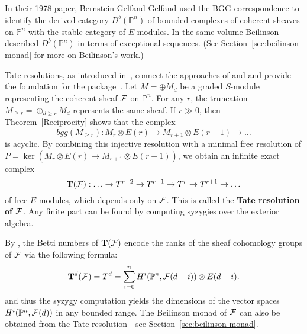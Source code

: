 \documentclass[twoside,12pt, leqno]{amsart}
\def\PP{{\mathbb P}}
\def\bT{{\bf T}}
\def\CU{{\mathcal U}}
\def\daniel#1{{\bf *** Daniel:} #1 {\bf ***}}
\begin{document}
In their 1978 paper, Bernstein-Gelfand-Gelfand \cite{BGG} used the BGG correspondence to identify  the derived category $D^b(\PP^n)$ of bounded complexes of coherent sheaves on $\PP^n$ with the stable category of $E$-modules. In the same volume \cite{beilinson} Beilinson described
$D^b(\PP^n)$ in terms of exceptional sequences.  (See Section~\ref{sec:beilinson monad} for more on Beilinson's work.)


Tate resolutions, as introduced in~\cite{EFS}, connect the approaches of \cite{BGG} and \cite{beilinson} and provide the foundation for the package~\cite{M2BGG}.
Let $M=\oplus M_d$ be a graded $S$-module representing the coherent sheaf ${\mathcal F}$ on $\PP^n$. For any $r$, the truncation $M_{\ge r} = \oplus_{d \ge r}M_d$ represents the same sheaf.  If $r\gg 0$, then Theorem~\ref{Reciprocity} shows that the  complex
$$
bgg(M_{\ge r}) : M_r\otimes E(r) \to M_{r+1}\otimes E(r+1) \to \ldots
$$ 
is acyclic. By combining this injective resolution with a minimal free resolution of $P=\ker(M_r\otimes E(r) \to M_{r+1}\otimes E(r+1))$, we obtain an infinite exact complex
$$
\bT(\sF):   \ldots \to T^{r-2} \to T^{r-1} \to T^r \to T^{r+1} \to \ldots
$$
of free $E$-modules, which depends only on ${\mathcal F}$.  This is called the {\bf Tate resolution of ${\mathcal F}$}. Any finite part can be found by computing syzygies over the exterior algebra.

By \cite[Theorem 4.1] {EFS}, the Betti numbers of $\bT(\sF)$ encode the ranks of the sheaf cohomology groups of ${\mathcal F}$ via the following formula:
$$
\bT^d(\sF) =T^d= \sum_{i=0}^n H^i(\PP^n,\sF(d-i)) \otimes E(d-i).
$$
and thus the syzygy computation yields the dimensions of the vector spaces $H^i(\PP^n,\sF(d))$ in any bounded range. The Beilinson monad of ${\mathcal F}$ can also be obtained from the Tate resolution---see Section~\ref{sec:beilinson monad}.
\end{document}
